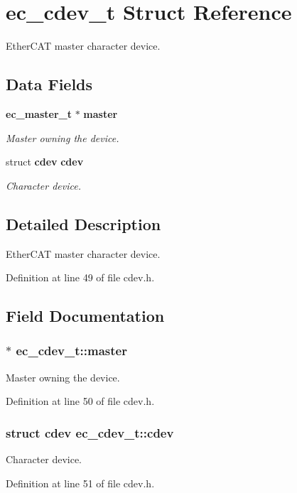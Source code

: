 \section{ec\-\_\-cdev\-\_\-t \-Struct \-Reference}
\label{structec__cdev__t}


\-Ether\-C\-A\-T master character device.  


\subsection*{\-Data \-Fields}
\begin{DoxyCompactItemize}
\item 
{\bf ec\-\_\-master\-\_\-t} $\ast$ {\bf master}
\begin{DoxyCompactList}\small\item\em \-Master owning the device. \end{DoxyCompactList}\item 
struct {\bf cdev} {\bf cdev}
\begin{DoxyCompactList}\small\item\em \-Character device. \end{DoxyCompactList}\end{DoxyCompactItemize}


\subsection{\-Detailed \-Description}
\-Ether\-C\-A\-T master character device. 

\-Definition at line 49 of file cdev.\-h.



\subsection{\-Field \-Documentation}
\subsubsection[{master}]{$\ast$ {\bf ec\-\_\-cdev\-\_\-t\-::master}}\label{structec__cdev__t_ad6d790982111fa9d63a1e0d1baf0828f}


\-Master owning the device. 



\-Definition at line 50 of file cdev.\-h.

\subsubsection[{cdev}]{\setlength{\rightskip}{0pt plus 5cm}struct {\bf cdev} {\bf ec\-\_\-cdev\-\_\-t\-::cdev}}\label{structec__cdev__t_a5595c2c852f7a794ca343013e96e619a}


\-Character device. 



\-Definition at line 51 of file cdev.\-h.

